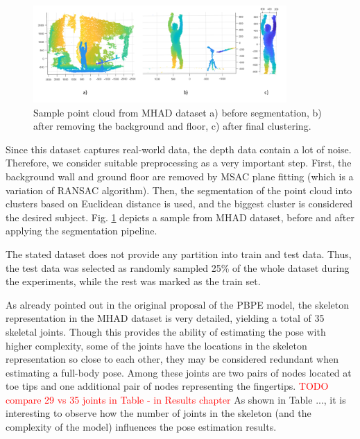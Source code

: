 \begin{figure}[H]
\begin{center}
  \includegraphics[height=140px]{images/implementation/mhad.png}
  \caption[Sample point cloud from MHAD dataset \cite{Vidal:2013:BMC:2478277.2478412}.]{ Sample point cloud from MHAD dataset \cite{Vidal:2013:BMC:2478277.2478412} a) before segmentation, b) after removing the background and floor, c) after final clustering.}
  \label{fig:mhad}
\end{center}
\end{figure}

\noindent
Since this dataset captures real-world data, the depth data contain a lot of noise. Therefore, we consider suitable preprocessing as a very important step. First, the background wall and ground floor are removed by MSAC plane fitting (which is a variation of RANSAC algorithm). Then, the segmentation of the point cloud into clusters based on Euclidean distance is used, and the biggest cluster is considered the desired subject. Fig. \ref{fig:mhad} depicts a sample from MHAD dataset, before and after applying the segmentation pipeline.\par

\vspace{5mm}
\noindent
The stated dataset does not provide any partition into train and test data. Thus, the test data was selected as randomly sampled 25\% of the whole dataset during the experiments, while the rest was marked as the train set.\par
\vspace{5mm}
\noindent 
As already pointed out in the original proposal of the PBPE model, the skeleton representation in the MHAD dataset is very detailed, yielding a total of 35 skeletal joints. Though this provides the ability of estimating the pose with higher complexity, some of the joints have the locations in the skeleton representation so close to each other, they may be considered redundant when estimating a full-body pose. Among these joints are two pairs of nodes located at toe tips and one additional pair of nodes representing the fingertips.
\textcolor{red}{TODO compare 29 vs 35 joints in Table - in Results chapter} As shown in Table ..., it is interesting to observe how the number of joints in the skeleton (and the complexity of the model) influences the pose estimation results.

